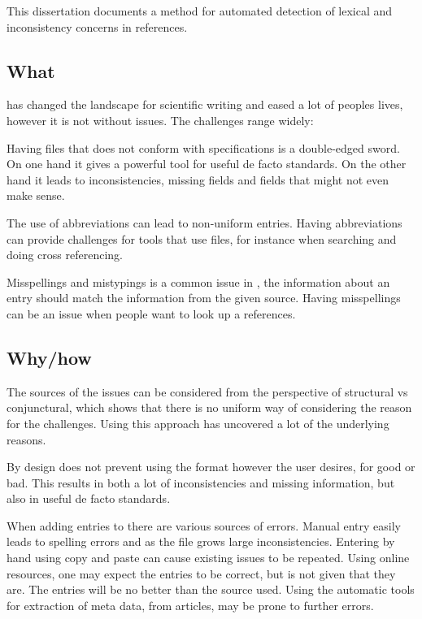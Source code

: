 
This dissertation documents a method for automated detection of
lexical and inconsistency concerns in {\bibtex} references.

\subsection{What }

{\bibtex} has changed the landscape for scientific writing and eased a
lot of peoples lives, however it is not without issues.  The
challenges range widely:

Having files that does not conform with specifications is a
double-edged sword.  On one hand it gives a powerful tool for useful
de facto standards.  On the other hand it leads to inconsistencies,
missing fields and fields that might not even make sense.

The use of abbreviations can lead to non-uniform entries.  Having
abbreviations can provide challenges for tools that use {\bibtex}
files, for instance when searching and doing cross referencing.

Misspellings and mistypings is a common issue in {\bibtex}, the
information about an entry should match the information from the given
source.  Having misspellings can be an issue when people want to look
up a references.


\subsection{Why/how }

The sources of the issues can be considered from the perspective of
structural vs conjunctural, which shows that there is no uniform way
of considering the reason for the challenges.  Using this approach has
uncovered a lot of the underlying reasons.

By design {\bibtex} does not prevent using the format however the user
desires, for good or bad.  This results in both a lot of
inconsistencies and missing information, but also in useful de facto
standards.

When adding entries to {\bibtex} there are various sources of errors.
Manual entry easily leads to spelling errors and as the file grows
large inconsistencies.  Entering by hand using copy and paste can
cause existing issues to be repeated.  Using online resources, one may
expect the entries to be correct, but is not given that they are.  The
entries will be no better than the source used.  Using the automatic
tools for extraction of meta data, from articles, may be prone to
further errors.

